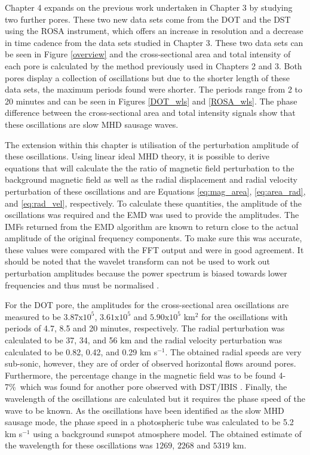     Chapter 4 expands on the previous work undertaken in Chapter 3 by studying two further pores.
    These two new data sets come from the DOT and the DST using the ROSA instrument, which offers an increase in resolution and a decrease in time cadence from the data sets studied in Chapter 3.
    These two data sets can be seen in Figure \ref{overview} and the cross-sectional area and total intensity of each pore is calculated by the method previously used in Chapters 2 and 3. 
    Both pores display a collection of oscillations but due to the shorter length of these data sets, the maximum periods found were shorter.
    The periods range from 2 to 20 minutes and can be seen in Figures \ref{DOT_wls} and \ref{ROSA_wls}.     
    The phase difference between the cross-sectional area and total intensity signals show that these oscillations are slow MHD sausage waves.
    
    The extension within this chapter is utilisation of the perturbation amplitude of these oscillations.
    Using linear ideal MHD theory, it is possible to derive equations that will calculate the the ratio of magnetic field perturbation to the background magnetic field as well as the radial displacement and radial velocity perturbation of these oscillations and are Equations \ref{eq:mag_area}, \ref{eq:area_rad}, and \ref{eq:rad_vel}, respectively. 
    To calculate these quantities, the amplitude of the oscillations was required and the EMD was used to provide the amplitudes.
    The IMFs returned from the EMD algorithm are known to return close to the actual amplitude of the original frequency components.
    To make sure this was accurate, these values were compared with the FFT output and were in good agreement.
	It should be noted that the wavelet transform can not be used to work out perturbation amplitudes  because the power spectrum is biased towards lower frequencies and thus must be normalised \citep{liu2007rectification}.
  
    For the DOT pore, the amplitudes for the cross-sectional area oscillations are measured to be $3.87\mathrm{x}10^5$, $3.61\mathrm{x}10^5$ and $5.90\mathrm{x}10^5$ km$^2$ for the oscillations with periods of 4.7, 8.5 and 20 minutes, respectively.
    The radial perturbation was calculated to be 37, 34, and 56 km and the radial velocity perturbation was calculated to be 0.82, 0.42, and 0.29 km s$^{-1}$.
    The obtained radial speeds are very sub-sonic, however, they are of order of observed horizontal flows around pores.
    Furthermore, the percentage change in the magnetic field was to be found 4-7\%\ which was found for another pore observed with DST/IBIS \citep{0004-637X-806-1-132}.
    Finally, the wavelength of the oscillations are calculated but it requires the phase speed of the wave to be known.
    As the oscillations have been identified as the slow MHD sausage mode, the phase speed in a photospheric tube was calculated to be 5.2 km s$^{-1}$ using a background sunspot atmosphere model.
    The obtained estimate of the wavelength for these oscillations was $1269$, $2268$ and $5319$ km.
       
